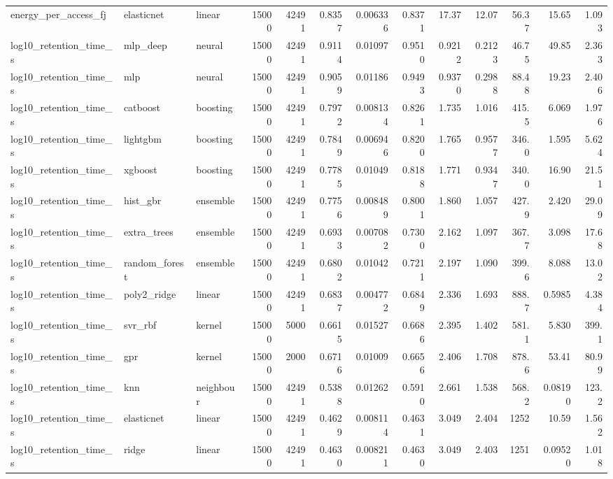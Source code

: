 \begin{table}[!t]
\begin{tabular}{lllrrrrrrrrrr}
energy\_per\_access\_fj & elasticnet & linear & 15000 & 42491 & 0.8357 & 0.006336 & 0.8371 & 17.37 & 12.07 & 56.37 & 15.65 & 1.093 \\
log10\_retention\_time\_s & mlp\_deep & neural & 15000 & 42491 & 0.9114 & 0.01097 & 0.9510 & 0.9212 & 0.2123 & 46.75 & 49.85 & 2.363 \\
log10\_retention\_time\_s & mlp & neural & 15000 & 42491 & 0.9059 & 0.01186 & 0.9493 & 0.9370 & 0.2988 & 88.48 & 19.23 & 2.406 \\
log10\_retention\_time\_s & catboost & boosting & 15000 & 42491 & 0.7972 & 0.008134 & 0.8261 & 1.735 & 1.016 & 415.5 & 6.069 & 1.976 \\
log10\_retention\_time\_s & lightgbm & boosting & 15000 & 42491 & 0.7849 & 0.006946 & 0.8200 & 1.765 & 0.9577 & 346.0 & 1.595 & 5.624 \\
log10\_retention\_time\_s & xgboost & boosting & 15000 & 42491 & 0.7785 & 0.01049 & 0.8188 & 1.771 & 0.9347 & 340.0 & 16.90 & 21.51 \\
log10\_retention\_time\_s & hist\_gbr & ensemble & 15000 & 42491 & 0.7756 & 0.008489 & 0.8001 & 1.860 & 1.057 & 427.9 & 2.420 & 29.09 \\
log10\_retention\_time\_s & extra\_trees & ensemble & 15000 & 42491 & 0.6933 & 0.007082 & 0.7300 & 2.162 & 1.097 & 367.7 & 3.098 & 17.68 \\
log10\_retention\_time\_s & random\_forest & ensemble & 15000 & 42491 & 0.6802 & 0.01042 & 0.7211 & 2.197 & 1.090 & 399.6 & 8.088 & 13.02 \\
log10\_retention\_time\_s & poly2\_ridge & linear & 15000 & 42491 & 0.6837 & 0.004772 & 0.6849 & 2.336 & 1.693 & 888.7 & 0.5985 & 4.384 \\
log10\_retention\_time\_s & svr\_rbf & kernel & 15000 & 5000 & 0.6615 & 0.01527 & 0.6686 & 2.395 & 1.402 & 581.1 & 5.830 & 399.1 \\
log10\_retention\_time\_s & gpr & kernel & 15000 & 2000 & 0.6716 & 0.01009 & 0.6656 & 2.406 & 1.708 & 878.6 & 53.41 & 80.99 \\
log10\_retention\_time\_s & knn & neighbour & 15000 & 42491 & 0.5388 & 0.01262 & 0.5910 & 2.661 & 1.538 & 568.2 & 0.08190 & 123.2 \\
log10\_retention\_time\_s & elasticnet & linear & 15000 & 42491 & 0.4629 & 0.008114 & 0.4631 & 3.049 & 2.404 & 1252 & 10.59 & 1.562 \\
log10\_retention\_time\_s & ridge & linear & 15000 & 42491 & 0.4630 & 0.008211 & 0.4630 & 3.049 & 2.403 & 1251 & 0.09520 & 1.018 \\

\end{tabular}
\end{table}

